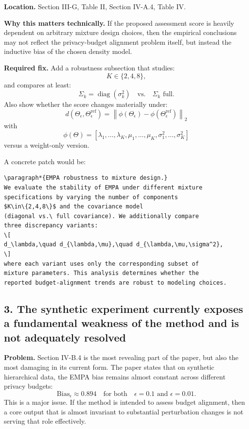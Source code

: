 \textbf{Location.}  
Section III-G, Table II, Section IV-A.4, Table IV.

\textbf{Why this matters technically.}  
If the proposed assessment score is heavily dependent on arbitrary mixture design choices, then the empirical conclusions may not reflect the privacy-budget alignment problem itself, but instead the inductive bias of the chosen density model.

\textbf{Required fix.}  
Add a robustness subsection that studies:
\[
K \in \{2,4,8\},
\]
and compares at least:
\[
\Sigma_k = \operatorname{diag}(\sigma_k^2)
\quad \text{vs.} \quad
\Sigma_k \text{ full}.
\]
Also show whether the score changes materially under:
\[
d(\Theta_\epsilon,\Theta_\epsilon^{\mathrm{ref}})
=
\left\|
\phi(\Theta_\epsilon)-\phi(\Theta_\epsilon^{\mathrm{ref}})
\right\|_2
\]
with
\[
\phi(\Theta)
=
[\lambda_1,\dots,\lambda_K,\mu_1,\dots,\mu_K,\sigma_1^2,\dots,\sigma_K^2]
\]
versus a weight-only version.

A concrete patch would be:

\begin{verbatim}
\paragraph*{EMPA robustness to mixture design.}
We evaluate the stability of EMPA under different mixture
specifications by varying the number of components
$K\in\{2,4,8\}$ and the covariance model
(diagonal vs.\ full covariance). We additionally compare
three discrepancy variants:
\[
d_\lambda,\quad d_{\lambda,\mu},\quad d_{\lambda,\mu,\sigma^2},
\]
where each variant uses only the corresponding subset of
mixture parameters. This analysis determines whether the
reported budget-alignment trends are robust to modeling choices.
\end{verbatim}

\subsection*{3. The synthetic experiment currently exposes a fundamental weakness of the method and is not adequately resolved}

\textbf{Problem.}  
Section IV-B.4 is the most revealing part of the paper, but also the most damaging in its current form. The paper states that on synthetic hierarchical data, the EMPA bias remains almost constant across different privacy budgets:
\[
\mathrm{Bias}_\epsilon \approx 0.894
\quad \text{for both} \quad
\epsilon=0.1 \text{ and } \epsilon=0.01.
\]
This is a major issue. If the method is intended to assess budget alignment, then a core output that is almost invariant to substantial perturbation changes is not serving that role effectively.

